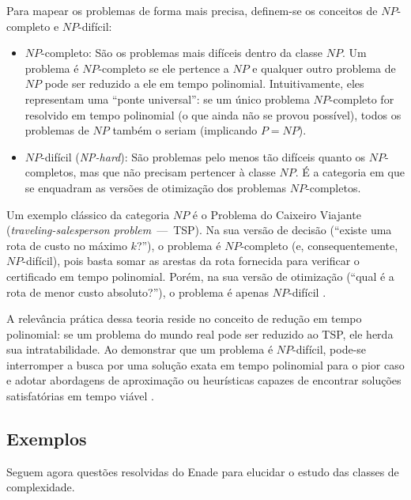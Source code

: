 \documentclass[12pt,a4paper]{article}
\begin{document}
Para mapear os problemas de forma mais precisa, definem-se os conceitos de $NP$-completo e $NP$-difícil:
\begin{itemize}
    \item $NP$-completo:\label{it:npc}
    São os problemas mais difíceis dentro da classe $NP$.
    Um problema é $NP$-completo se ele pertence a $NP$ e qualquer outro problema de $NP$ pode ser reduzido a ele em tempo polinomial.
    Intuitivamente, eles representam uma ``ponte universal'': se um único problema $NP$-completo for resolvido em tempo polinomial
    (o que ainda não se provou possível),
    todos os problemas de $NP$ também o seriam (implicando $P = NP$).
    \item $NP$-difícil (\textit{NP-hard}):
    São problemas pelo menos tão difíceis quanto os $NP$-completos, mas que não precisam pertencer à classe $NP$.
    É a categoria em que se enquadram as versões de otimização dos problemas $NP$-completos.
\end{itemize}

Um exemplo clássico da categoria $NP$ é o Problema do Caixeiro Viajante (\textit{traveling-salesperson problem}~---~TSP).
Na sua versão de decisão (``existe uma rota de custo no máximo $k$?''), o problema é $NP$-completo (e, consequentemente, $NP$-difícil),
pois basta somar as arestas da rota fornecida para verificar o certificado em tempo polinomial.
Porém, na sua versão de otimização (``qual é a rota de menor custo absoluto?''),
o problema é apenas $NP$-difícil \parencite[seç.~34.5.4]{clrs2022}.

A relevância prática dessa teoria reside no conceito de redução em tempo polinomial:
se um problema do mundo real pode ser reduzido ao TSP, ele herda sua intratabilidade.
Ao demonstrar que um problema é $NP$-difícil, pode-se interromper a busca por uma solução exata em tempo polinomial para o pior caso
e adotar abordagens de aproximação ou heurísticas capazes de encontrar soluções satisfatórias em tempo viável \parencite[1045--1047,seç.~35.2]{clrs2022}.

\subsection{Exemplos}
Seguem agora questões resolvidas do Enade para elucidar o estudo das classes de complexidade.
\end{document}
